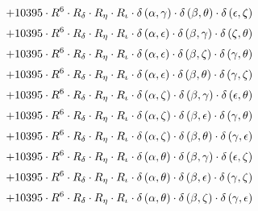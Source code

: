 \begin{subequations}
\begin{gather}
 \\[0.2em] \notag 		 + 10395 \cdot R^{6} \cdot R_{\delta{}} \cdot R_{\eta{}} \cdot R_{\iota{}} \cdot \delta{}\left(\alpha{}, \gamma{}\right) \cdot \delta{}\left(\beta{}, \theta{}\right) \cdot \delta{}\left(\epsilon{}, \zeta{}\right) 
 \\[0.2em] \notag 		 + 10395 \cdot R^{6} \cdot R_{\delta{}} \cdot R_{\eta{}} \cdot R_{\iota{}} \cdot \delta{}\left(\alpha{}, \epsilon{}\right) \cdot \delta{}\left(\beta{}, \gamma{}\right) \cdot \delta{}\left(\zeta{}, \theta{}\right) 
 \\[0.2em] \notag 		 + 10395 \cdot R^{6} \cdot R_{\delta{}} \cdot R_{\eta{}} \cdot R_{\iota{}} \cdot \delta{}\left(\alpha{}, \epsilon{}\right) \cdot \delta{}\left(\beta{}, \zeta{}\right) \cdot \delta{}\left(\gamma{}, \theta{}\right) 
 \\[0.2em] \notag 		 + 10395 \cdot R^{6} \cdot R_{\delta{}} \cdot R_{\eta{}} \cdot R_{\iota{}} \cdot \delta{}\left(\alpha{}, \epsilon{}\right) \cdot \delta{}\left(\beta{}, \theta{}\right) \cdot \delta{}\left(\gamma{}, \zeta{}\right) 
 \\[0.2em] \notag 		 + 10395 \cdot R^{6} \cdot R_{\delta{}} \cdot R_{\eta{}} \cdot R_{\iota{}} \cdot \delta{}\left(\alpha{}, \zeta{}\right) \cdot \delta{}\left(\beta{}, \gamma{}\right) \cdot \delta{}\left(\epsilon{}, \theta{}\right) 
 \\[0.2em] \notag 		 + 10395 \cdot R^{6} \cdot R_{\delta{}} \cdot R_{\eta{}} \cdot R_{\iota{}} \cdot \delta{}\left(\alpha{}, \zeta{}\right) \cdot \delta{}\left(\beta{}, \epsilon{}\right) \cdot \delta{}\left(\gamma{}, \theta{}\right) 
 \\[0.2em] \notag 		 + 10395 \cdot R^{6} \cdot R_{\delta{}} \cdot R_{\eta{}} \cdot R_{\iota{}} \cdot \delta{}\left(\alpha{}, \zeta{}\right) \cdot \delta{}\left(\beta{}, \theta{}\right) \cdot \delta{}\left(\gamma{}, \epsilon{}\right) 
 \\[0.2em] \notag 		 + 10395 \cdot R^{6} \cdot R_{\delta{}} \cdot R_{\eta{}} \cdot R_{\iota{}} \cdot \delta{}\left(\alpha{}, \theta{}\right) \cdot \delta{}\left(\beta{}, \gamma{}\right) \cdot \delta{}\left(\epsilon{}, \zeta{}\right) 
 \\[0.2em] \notag 		 + 10395 \cdot R^{6} \cdot R_{\delta{}} \cdot R_{\eta{}} \cdot R_{\iota{}} \cdot \delta{}\left(\alpha{}, \theta{}\right) \cdot \delta{}\left(\beta{}, \epsilon{}\right) \cdot \delta{}\left(\gamma{}, \zeta{}\right) 
 \\[0.2em] \notag 		 + 10395 \cdot R^{6} \cdot R_{\delta{}} \cdot R_{\eta{}} \cdot R_{\iota{}} \cdot \delta{}\left(\alpha{}, \theta{}\right) \cdot \delta{}\left(\beta{}, \zeta{}\right) \cdot \delta{}\left(\gamma{}, \epsilon{}\right) 

\end{gather}
\end{subequations}
